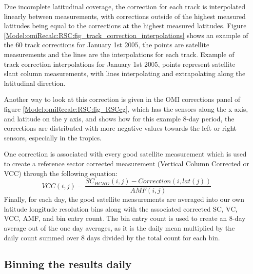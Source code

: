     Due incomplete latitudinal coverage, the correction for each track is interpolated linearly between measurements, with corrections outside of the highest measured latitudes being equal to the corrections at the highest measured latitudes.
    Figure \ref{Model:omiRecalc:RSC:fig_track_correction_interpolations} shows an example of the 60 track corrections for January 1st 2005, the points are satellite measurements and the lines are the interpolations for each track.
      {Example of track correction interpolations for January 1st 2005, points represent satellite slant column measurements, with lines interpolating and extrapolating along the latitudinal direction.}
      {\label{Model:omiRecalc:RSC:fig_track_correction_interpolations}}
    
    Another way to look at this correction is given in the OMI corrections panel of figure \ref{Model:omiRecalc:RSC:fig_RSCeg}, which has the sensors along the x axis, and latitude on the y axis, and shows how for this example 8-day period, the corrections are distributed with more negative values towards the left or right sensors, especially in the tropics.
    
    One correction is associated with every good satellite measurement which is used to create a reference sector corrected measurement (Vertical Column Corrected or VCC) through the following equation:
    \begin{equation}
    VCC(i,j) = \frac{SC_{HCHO}(i,j) - Correction(i,lat(j))}{AMF(i,j)}
    \end{equation}
    Finally, for each day, the good satellite measurements are averaged into our own latitude longitude resolution bins along with the associated corrected SC, VC, VCC, AMF, and bin entry count.
    The bin entry count is used to create an 8-day average out of the one day averages, as it is the daily mean multiplied by the daily count summed over 8 days divided by the total count for each bin.
  
  \subsection{Binning the results daily}
    
